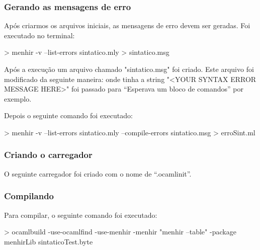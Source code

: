 \documentclass[12pt,a4paper]{report}
\begin{document}









\subsubsection{Gerando as mensagens de erro}
\label{errosint}
Após criarmos os arquivos iniciais, as mensagens de erro devem ser geradas.
Foi executado no terminal:

\begin{terminal}
> menhir -v --list-errors sintatico.mly > sintatico.msg
\end{terminal}

Após a execução um arquivo chamado "sintatico.msg" foi criado. Este arquivo foi modificado da seguinte maneira: onde tinha a string "<YOUR SYNTAX ERROR MESSAGE HERE>" foi passado para ``Esperava um bloco de comandos'' por exemplo.


Depois o seguinte comando foi executado:

\begin{terminal}
> menhir -v --list-errors sintatico.mly --compile-errors sintatico.msg > erroSint.ml
\end{terminal}


\subsubsection{Criando o carregador}

O seguinte carregador foi criado com o nome de ``.ocamlinit''. 




\subsubsection{Compilando}

Para compilar, o seguinte comando foi executado:

\begin{terminal}
> ocamlbuild -use-ocamlfind -use-menhir -menhir "menhir --table" -package menhirLib sintaticoTest.byte
\end{terminal}
\end{document}
